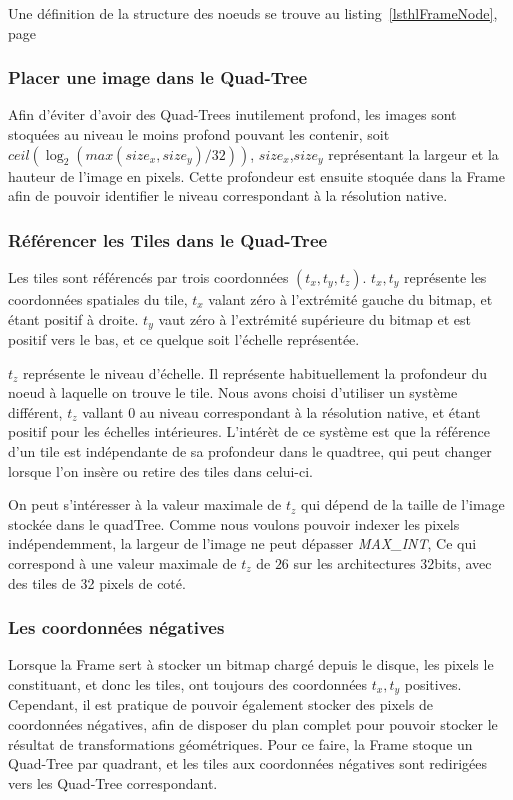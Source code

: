 				Une définition de la structure des noeuds se trouve au listing~\ref{lsthlFrameNode}, page~\pageref{lsthlFrameNode}

			\subsubsection{Placer une image dans le Quad-Tree}
				Afin d'éviter d'avoir des Quad-Trees inutilement profond, les images sont stoquées au niveau le moins profond pouvant les contenir,
				soit $ceil( \log_2( max(size_x,size_y)/32))$, $size_x$,$size_y$ représentant la largeur et la hauteur de l'image en pixels.
				Cette profondeur est ensuite stoquée dans la Frame afin de pouvoir identifier le niveau correspondant à la résolution native.

			\subsubsection{Référencer les Tiles dans le Quad-Tree}
				Les tiles sont référencés par trois coordonnées $(t_x,t_y,t_z)$. $t_x,t_y$ représente les coordonnées spatiales du tile, $t_x$ valant
				zéro à l'extrémité gauche du bitmap, et étant positif à droite. $t_y$ vaut zéro à l'extrémité supérieure du bitmap et est positif vers le bas,
				et ce quelque soit l'échelle représentée.
				
				$t_z$ représente le niveau d'échelle. Il représente habituellement la profondeur du noeud à laquelle on trouve le tile. Nous avons
				choisi d'utiliser un système différent, $t_z$ vallant $0$ au niveau correspondant à la résolution native, et étant positif
				pour les échelles intérieures. L'intérèt de ce système est que la référence d'un tile est indépendante de sa profondeur dans
				le quadtree, qui peut changer lorsque l'on insère ou retire des tiles dans celui-ci.
				
				On peut s'intéresser à la valeur maximale de $t_z$ qui dépend de la taille de l'image stockée dans le quadTree.
				Comme nous voulons pouvoir indexer les pixels indépendemment, la largeur de l'image ne peut dépasser
				\emph{MAX\_INT}, Ce qui correspond à une valeur maximale de $t_z$ de $26$ sur les architectures 32bits, avec des tiles de 32 pixels
				de coté.
				
			\subsubsection{Les coordonnées négatives}
				Lorsque la Frame sert à stocker un bitmap chargé depuis le disque, les pixels le constituant, et donc les tiles, ont toujours des
				coordonnées $t_x,t_y$ positives. Cependant, il est pratique de pouvoir également stocker des pixels de coordonnées négatives, afin
				de disposer du plan complet pour pouvoir stocker le résultat de transformations géométriques. Pour ce faire, la Frame
				stoque un Quad-Tree par quadrant, et les tiles aux coordonnées négatives sont redirigées vers les Quad-Tree correspondant.

